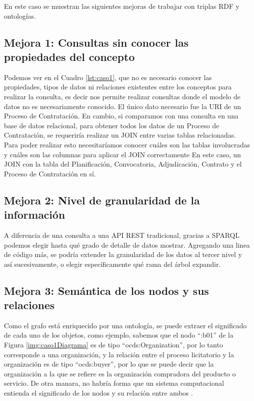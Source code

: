 En este caso se muestran las siguientes mejoras de trabajar con triplas RDF y ontologías.

\subsection{Mejora 1: Consultas sin conocer las propiedades del concepto}

Podemos ver en el Cuadro \ref{lst:caso1}, que no es necesario conocer las propiedades, tipos de datos ni relaciones existentes entre los conceptos para realizar la consulta, es decir nos permite realizar consultas donde el modelo de datos no es necesariamente conocido. El único dato necesario fue la URI de un Proceso de Contratación. En cambio, si comparamos con una consulta en una base de datos relacional, para obtener todos los datos de un Proceso de Contratación, se requeriría realizar un JOIN entre varias tablas relacionadas.  Para poder realizar esto necesitaríamos conocer cuáles son las tablas involucradas y cuáles son las columnas para aplicar el JOIN correctamente En este caso, un JOIN con la tabla del Planificación, Convocatoria, Adjudicación, Contrato  y el Proceso de  Contratación en sí.

\subsection{Mejora 2: Nivel de granularidad de la información}

A diferencia de una consulta a una API REST tradicional, gracias a SPARQL podemos elegir hasta qué grado de detalle de datos mostrar. Agregando una linea de código más, se podría extender la granularidad de los datos al tercer nivel y así sucesivamente, o elegir específicamente qué rama del árbol expandir.

\subsection{Mejora 3: Semántica de los nodos y sus relaciones}

Como el grafo está enriquecido por una ontología, se puede extraer el significado de cada uno de los objetos, como ejemplo, sabemos que el nodo “:b01” de la Figura \ref{img:caso1Diagrama} es de tipo “ocds:Organization”, por lo tanto corresponde a una organización, y la relación entre el proceso licitatorio y la organización es de tipo “ocds:buyer”, por lo que se puede decir que la organización a la que se refiere es la organización compradora del producto o servicio. De otra manara, no habría forma que un sistema computacional entienda el significado de los nodos y su relación entre ambos .
    

